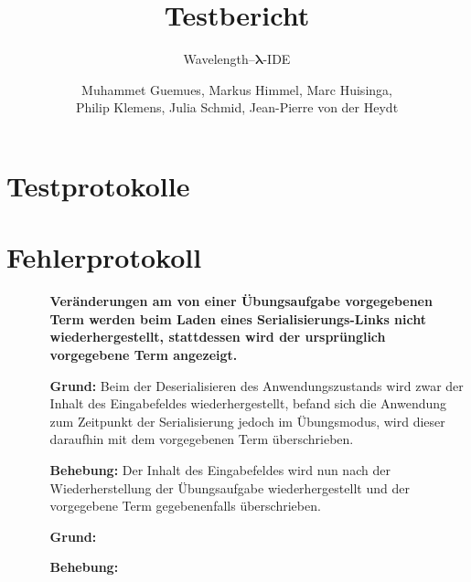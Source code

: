 \documentclass[parskip=full,11pt]{scrartcl}
\title{Testbericht}
\subtitle{Wavelength--$\bm{\lambda}$-IDE}
\author{Muhammet Guemues, Markus Himmel, Marc Huisinga,\\Philip Klemens, Julia Schmid, Jean-Pierre von der Heydt}
\begin{document}
\maketitle
\newpage
\tableofcontents
\newpage

\section{Testprotokolle}

\section{Fehlerprotokoll}

\begin{itemize}

\item[]
\begin{itemize}[noitemsep]
\item[] {\bfseries Veränderungen am von einer Übungsaufgabe vorgegebenen Term  werden beim Laden eines Serialisierungs-Links nicht wiederhergestellt, stattdessen wird der ursprünglich vorgegebene Term angezeigt. }
\item [\textbf{Grund:}] Beim der Deserialisieren des Anwendungszustands wird zwar der Inhalt des Eingabefeldes wiederhergestellt, befand sich die Anwendung zum Zeitpunkt der Serialisierung jedoch im Übungsmodus, wird dieser daraufhin mit dem vorgegebenen Term überschrieben. 
\item [\textbf{Behebung:}] Der Inhalt des Eingabefeldes wird nun nach der Wiederherstellung der Übungsaufgabe wiederhergestellt und der vorgegebene Term gegebenenfalls überschrieben.
\end{itemize}

\item[]
\begin{itemize}[noitemsep]
\item[] {\bfseries  }
\item [\textbf{Grund:}]
\item [\textbf{Behebung:}]
\end{itemize}


\end{itemize}
\end{document}
